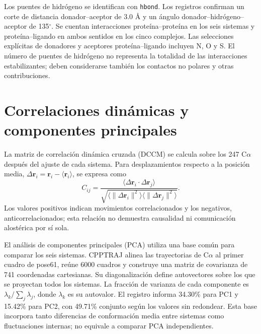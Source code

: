 \documentclass[12 pt, letter, oneside]{book}
\begin{document}
Los puentes de hidrógeno se identifican con \texttt{hbond}. Los registros confirman un corte de distancia donador--aceptor de 3.0 Å y un ángulo donador--hidrógeno--aceptor de 135$^\circ$. Se cuentan interacciones proteína--proteína en los seis sistemas y proteína--ligando en ambos sentidos en los cinco complejos. Las selecciones explícitas de donadores y aceptores proteína--ligando incluyen N, O y S. El número de puentes de hidrógeno no representa la totalidad de las interacciones estabilizantes; deben considerarse también los contactos no polares y otras contribuciones.

\section{Correlaciones dinámicas y componentes principales}
La matriz de correlación dinámica cruzada (DCCM) se calcula sobre los 247 C$\alpha$ después del ajuste de cada sistema. Para desplazamientos respecto a la posición media, $\Delta\mathbf r_i=\mathbf r_i-\langle\mathbf r_i\rangle$, se expresa como
\begin{equation}
 C_{ij}=\frac{\langle\Delta\mathbf r_i\cdot\Delta\mathbf r_j\rangle}
 {\sqrt{\langle\lVert\Delta\mathbf r_i\rVert^2\rangle\langle\lVert\Delta\mathbf r_j\rVert^2\rangle}}.
\end{equation}
Los valores positivos indican movimientos correlacionados y los negativos, anticorrelacionados; esta relación no demuestra causalidad ni comunicación alostérica por sí sola.

El análisis de componentes principales (PCA) utiliza una base común para comparar los seis sistemas. CPPTRAJ alinea las trayectorias de C$\alpha$ al primer cuadro de pose61, reúne 6000 cuadros y construye una matriz de covarianza de 741 coordenadas cartesianas. Su diagonalización define autovectores sobre los que se proyectan todos los sistemas. La fracción de varianza de cada componente es $\lambda_k/\sum_j\lambda_j$, donde $\lambda_k$ es su autovalor. El registro informa 34.30\% para PC1 y 15.42\% para PC2, con 49.71\% conjunto según los valores sin redondear. Esta base incorpora tanto diferencias de conformación media entre sistemas como fluctuaciones internas; no equivale a comparar PCA independientes.
\end{document}
